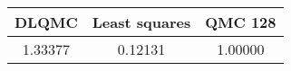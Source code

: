 \begin{tabular}{|c|c|c|}
\hline
DLQMC&Least squares&QMC 128\\ 
\hline

1.33377 & 0.12131 & 1.00000\\ 
\hline
\end{tabular}

